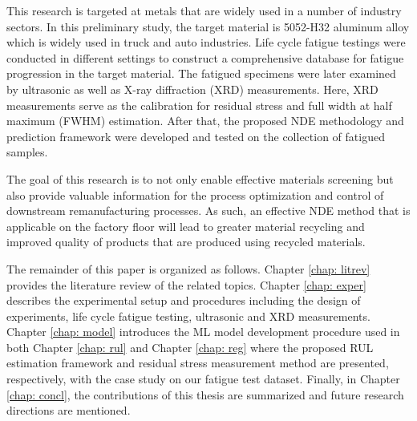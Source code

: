 This research is targeted at metals that are widely used in a number of industry sectors. In this preliminary study, the target material is 5052-H32 aluminum alloy which is widely used in truck and auto industries. Life cycle fatigue testings were conducted in different settings to construct a comprehensive database for fatigue progression in the target material. The fatigued specimens were later examined by ultrasonic as well as X-ray diffraction (XRD) measurements. Here, XRD measurements serve as the calibration for residual stress and full width at half maximum (FWHM) estimation. After that, the proposed NDE methodology and prediction framework were developed and tested on the collection of fatigued samples.

The goal of this research is to not only enable effective materials screening but also provide valuable information for the process optimization and control of downstream remanufacturing processes. As such, an effective NDE method that is applicable on the factory floor will lead to greater material recycling and improved quality of products that are produced using recycled materials.

The remainder of this paper is organized as follows. Chapter \ref{chap: litrev} provides the literature review of the related topics. Chapter \ref{chap: exper} describes the experimental setup and procedures including the design of experiments, life cycle fatigue testing, ultrasonic and XRD measurements. Chapter \ref{chap: model} introduces the ML model development procedure used in both Chapter \ref{chap: rul} and Chapter \ref{chap: reg} where the proposed RUL estimation framework and residual stress measurement method are presented, respectively, with the case study on our fatigue test dataset. Finally, in Chapter \ref{chap: concl}, the contributions of this thesis are summarized and future research directions are mentioned.

